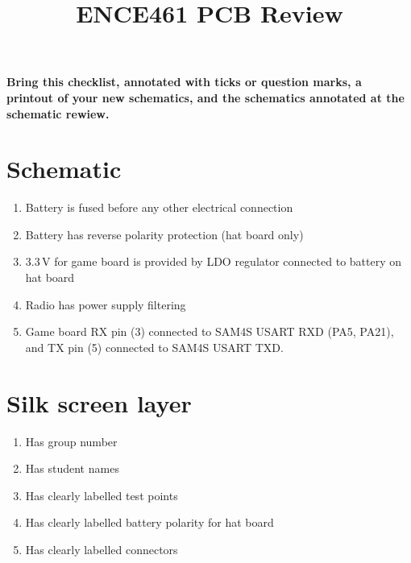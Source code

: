 \documentclass[a4paper, 12pt]{article}
\title{ENCE461 PCB Review}
\author{}
\date{}
\begin{document}
\maketitle


\begin{center}
  \textbf{Bring this checklist, annotated with ticks or question
    marks, a printout of your new schematics, and the schematics
    annotated at the schematic rewiew.}
\end{center}


\section*{Schematic}

\begin{enumerate}
\item Battery is fused before any other electrical connection

\item Battery has reverse polarity protection (hat board only)

\item 3.3\,V for game board is provided by LDO regulator connected to
  battery on hat board

\item Radio has power supply filtering

\item Game board RX pin (3) connected to SAM4S USART RXD (PA5, PA21), and TX pin
  (5) connected to SAM4S USART TXD.

\end{enumerate}


\section*{Silk screen layer}

\begin{enumerate}
\item Has group number

\item Has student names

\item Has clearly labelled test points

\item Has clearly labelled battery polarity for hat board

\item Has clearly labelled connectors  

\end{enumerate}
\end{document}
